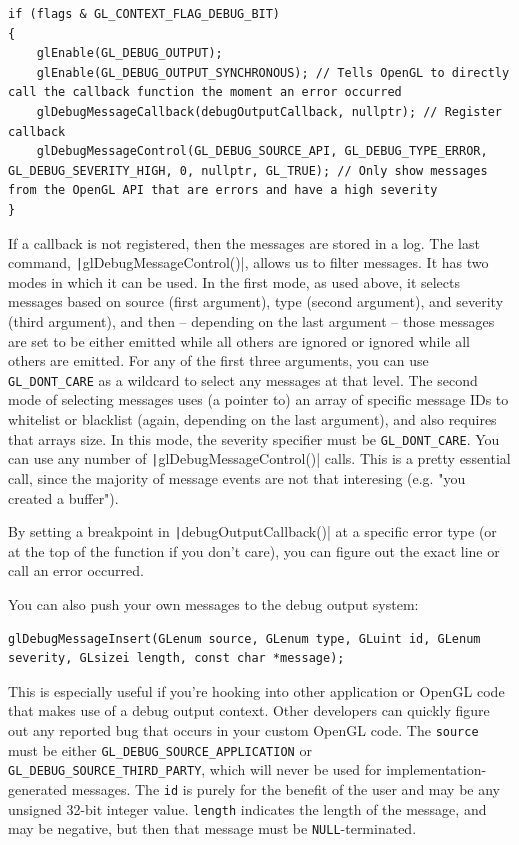 \documentclass[table, xcdraw]{article}%
\begin{document}
\begin{verbatim}
if (flags & GL_CONTEXT_FLAG_DEBUG_BIT)
{
    glEnable(GL_DEBUG_OUTPUT);
    glEnable(GL_DEBUG_OUTPUT_SYNCHRONOUS); // Tells OpenGL to directly call the callback function the moment an error occurred
    glDebugMessageCallback(debugOutputCallback, nullptr); // Register callback
    glDebugMessageControl(GL_DEBUG_SOURCE_API, GL_DEBUG_TYPE_ERROR, GL_DEBUG_SEVERITY_HIGH, 0, nullptr, GL_TRUE); // Only show messages from the OpenGL API that are errors and have a high severity
} 
\end{verbatim}

If a callback is not registered, then the messages are stored in a log. The last command, \texttt|glDebugMessageControl()|, allows us to filter messages. It has two modes in which it can be used. In the first mode, as used above, it selects messages based on source (first argument), type (second argument), and severity (third argument), and then -- depending on the last argument -- those messages are set to be either emitted while all others are ignored or ignored while all others are emitted. For any of the first three arguments, you can use \texttt{GL_DONT_CARE} as a wildcard to select any messages at that level. The second mode of selecting messages uses (a pointer to) an array of specific message IDs to whitelist or blacklist (again, depending on the last argument), and also requires that arrays size. In this mode, the severity specifier must be \texttt{GL_DONT_CARE}. You can use any number of \texttt|glDebugMessageControl()| calls. This is a pretty essential call, since the majority of message events are not that interesing (e.g. "you created a buffer").

By setting a breakpoint in \texttt|debugOutputCallback()| at a specific error type (or at the top of the function if you don't care), you can figure out the exact line or call an error occurred.

You can also push your own messages to the debug output system:

\begin{verbatim}
glDebugMessageInsert(GLenum source, GLenum type, GLuint id, GLenum severity, GLsizei length, const char *message);
\end{verbatim}

This is especially useful if you're hooking into other application or OpenGL code that makes use of a debug output context. Other developers can quickly figure out any reported bug that occurs in your custom OpenGL code. The \texttt{source} must be either \texttt{GL_DEBUG_SOURCE_APPLICATION} or \texttt{GL_DEBUG_SOURCE_THIRD_PARTY}, which will never be used for implementation-generated messages. The \texttt{id} is purely for the benefit of the user and may be any unsigned 32-bit integer value. \texttt{length} indicates the length of the message, and may be negative, but then that message must be \texttt{NULL}-terminated.
\end{document}
